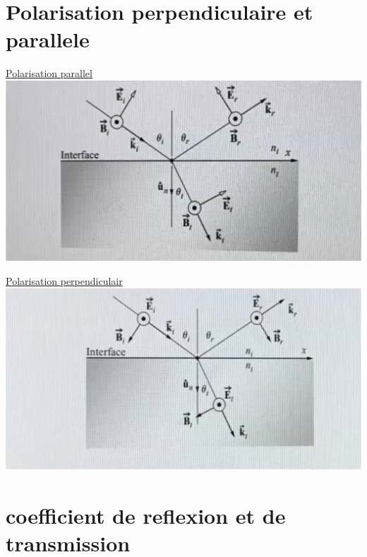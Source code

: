 \documentclass[12pt]{book}
\begin{document}
        \section{Polarisation perpendiculaire et parallele}
                \begin{center}
                    \begin{minipage}{0.49\linewidth}
                        \underline{Polarisation parallel} \\
                        \includegraphics[width =\linewidth]{pic/polarisationpar.png}
                    \end{minipage}
                    \begin{minipage}{0.49\linewidth}
                        \underline{Polarisation perpendiculair} \\
                        \includegraphics[width = \linewidth]{pic/polarisationperp.png}
                    \end{minipage}
                \end{center}
        \section{coefficient de reflexion et de transmission }
\end{document}
